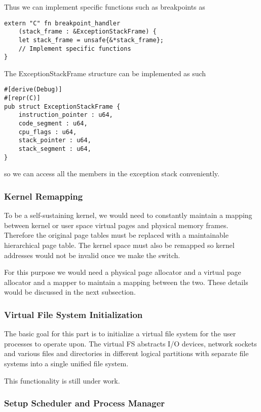 \documentclass[conference]{IEEEtran}
\begin{document}
Thus we can implement specific functions such as breakpoints as 

\begin{verbatim}
extern "C" fn breakpoint_handler
    (stack_frame : &ExceptionStackFrame) {
    let stack_frame = unsafe{&*stack_frame};
    // Implement specific functions
}
\end{verbatim}

The ExceptionStackFrame structure can be implemented as such
\begin{verbatim}
#[derive(Debug)]
#[repr(C)]
pub struct ExceptionStackFrame {
    instruction_pointer : u64,
    code_segment : u64,
    cpu_flags : u64,
    stack_pointer : u64,
    stack_segment : u64,
}
\end{verbatim}
so we can access all the members in the exception stack conveniently.

\subsubsection{Kernel Remapping}

To be a self-sustaining kernel, we would need to constantly maintain a mapping between kernel or user space virtual pages and physical memory frames. Therefore the original page tables must be replaced with a maintainable hierarchical page table. The kernel space must also be remapped so kernel addresses would not be invalid once we make the switch.

For this purpose we would need a physical page allocator and a virtual page allocator and a mapper to maintain a mapping between the two. These details would be discussed in the next subsection.

\subsubsection{Virtual File System Initialization}

The basic goal for this part is to initialize a virtual file system for the user processes to operate upon. The virtual FS abstracts I/O devices, network sockets and various files and directories in different logical partitions with separate file systems into a single unified file system.

This functionality is still under work.

\subsubsection{Setup Scheduler and Process Manager}
\end{document}
